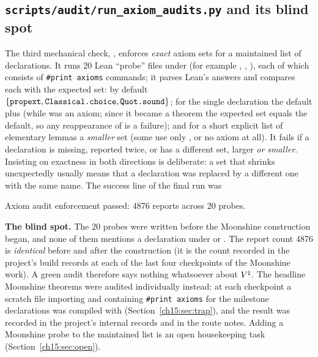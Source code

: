 \subsection{\texorpdfstring{\texttt{scripts/audit/run\_axiom\_audits.py}}{The axiom audit} and its blind spot}\label{ch15:sec:audit}

The third mechanical check, , enforces \emph{exact} axiom
sets for a maintained list of declarations. It runs 20 Lean ``probe'' files under
 (for example ,
, ), each of which consists of
\texttt{\#print axioms} commands; it parses Lean's answers and compares each with the expected set:
by default $\{\lean{propext},\lean{Classical.choice},\lean{Quot.sound}\}$; for the single
declaration  the default plus  (while
 was an axiom; since it became a theorem the expected set  equals the default,
so any reappearance of  is a failure); and for
a short explicit list of elementary lemmas a \emph{smaller} set (some use only , or
no axiom at all). It fails if a declaration is missing, reported twice, or has a different set,
larger \emph{or smaller}. Insisting on exactness in both directions is deliberate: a set that
shrinks unexpectedly usually means that a declaration was replaced by a different one with the same
name. The success line of the final run was
\begin{plaincode}
Axiom audit enforcement passed: 4876 reports across 20 probes.
\end{plaincode}

\begin{warning}
\textbf{The blind spot.} The 20 probes were written before the Moonshine construction began, and
none of them mentions a declaration under  or . The
report count 4876 is \emph{identical} before and after the construction (it is the count recorded
in the project's build records at each of the last four checkpoints of the Moonshine work). A green audit therefore says nothing
whatsoever about ${V^{\natural}}$. The headline Moonshine theorems were audited individually instead: at each
checkpoint a scratch file importing  and containing \texttt{\#print axioms} for the
milestone declarations was compiled with 
(Section~\ref{ch15:sec:trap}), and the result was recorded in the project's internal records and in the route
notes. Adding a Moonshine probe to the maintained list is an open housekeeping task
(Section~\ref{ch15:sec:open}).
\end{warning}

